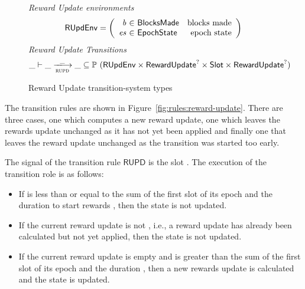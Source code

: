 \begin{figure}
  \emph{Reward Update environments}
  \begin{equation*}
    \RUpdEnv =
    \left(
      \begin{array}{r@{~\in~}lr}
        \var{b} & \BlocksMade & \text{blocks made} \\
        \var{es} & \EpochState & \text{epoch state} \\
      \end{array}
    \right)
  \end{equation*}
  \emph{Reward Update Transitions}
  \begin{equation*}
    \_ \vdash \var{\_} \trans{rupd}{\_} \var{\_} \subseteq
    \powerset (\RUpdEnv \times \RewardUpdate^? \times \Slot \times \RewardUpdate^?)
  \end{equation*}
  \caption{Reward Update transition-system types}
  \label{fig:ts-types:reward-update}
\end{figure}

The transition rules are shown in Figure~\ref{fig:rules:reward-update}. There
are three cases, one which computes a new reward update, one which leaves the
rewards update unchanged as it has not yet been applied and finally one that
leaves the reward update unchanged as the transition was started too early.

The signal of the transition rule $\mathsf{RUPD}$ is the slot . The
execution of the transition role is as follows:

\begin{itemize}
\item If  is less than or equal to the sum of the first slot of its epoch
  and the duration to start rewards \StartRewards, then the state is not
  updated.
\item If the current reward update  is not \Nothing, i.e., a reward
  update has already been calculated but not yet applied, then the state is not
  updated.
\item If the current reward update  is empty and  is greater than
  the sum of the first slot of its epoch and the duration \StartRewards, then a
  new rewards update is calculated and the state is updated.
\end{itemize}

